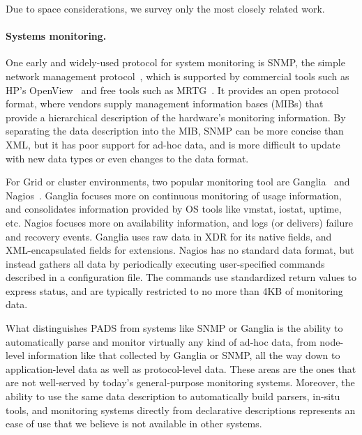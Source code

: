 
Due to space considerations, we survey only the most closely related work.

\paragraph*{Systems monitoring.}
One early and widely-used protocol for system monitoring is SNMP, the
simple network management protocol~\cite{snmprfc1157}, which is
supported by commercial tools such as HP's OpenView~\cite{openview}
and free tools such as MRTG~\cite{mrtg}. It provides an open protocol
format, where vendors supply  management information bases (MIBs)
that provide a hierarchical description of the hardware's monitoring
information. By separating the data description into the MIB, SNMP
can be more concise than XML, but it has poor support for ad-hoc
data, and is more difficult to update with new data types or even
changes to the data format.

For Grid or cluster environments, two popular monitoring tool are
Ganglia~\cite{ganglia} and Nagios~\cite{nagios}.  Ganglia focuses more
on continuous monitoring of usage information, and consolidates
information provided by OS tools like vmstat, iostat, uptime,
etc. Nagios focuses more on availability information, and logs (or
delivers) failure and recovery events. Ganglia uses raw data in XDR
for its native fields, and XML-encapsulated fields for extensions.
Nagios has no standard data format, but instead gathers all data by
periodically executing user-specified commands described in a
configuration file. The commands use standardized return values to
express status, and are typically restricted to no more than 4KB of
monitoring data.

What distinguishes PADS from systems like SNMP or Ganglia is the
ability to automatically parse and monitor virtually any kind of
ad-hoc data, from node-level information like that collected by
Ganglia or SNMP, all the way down to application-level data as well as
protocol-level data. These areas are the ones that are not well-served
by today's general-purpose monitoring systems. Moreover, the ability
to use the same data description to automatically build parsers, 
in-situ tools, and monitoring systems directly from declarative
descriptions represents an ease of use that
we believe is not available in other systems.


